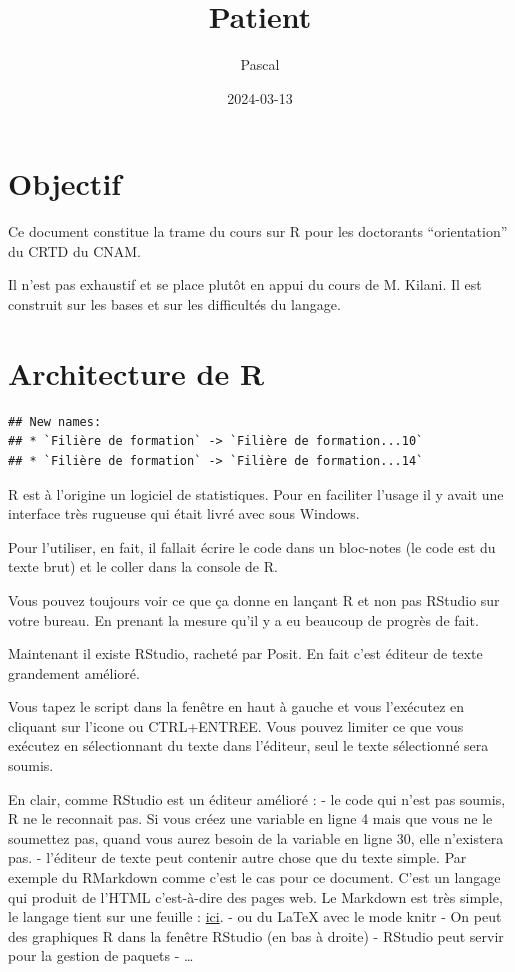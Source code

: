 \documentclass[
]{book}
\title{Patient}
\author{Pascal}
\date{2024-03-13}
\begin{document}
\maketitle

{
\setcounter{tocdepth}{1}
\tableofcontents
}
\chapter{Objectif}\label{objectif}

Ce document constitue la trame du cours sur R pour les doctorants ``orientation''
du CRTD du CNAM.

Il n'est pas exhaustif et se place plutôt en appui du cours de M. Kilani. Il est
construit sur les bases et sur les difficultés du langage.

\chapter{Architecture de R}\label{architecture-de-r}

\begin{verbatim}
## New names:
## * `Filière de formation` -> `Filière de formation...10`
## * `Filière de formation` -> `Filière de formation...14`
\end{verbatim}

R est à l'origine un logiciel de statistiques. Pour en faciliter l'usage il y
avait une interface très rugueuse qui était livré avec sous Windows.

Pour l'utiliser, en fait, il fallait écrire le code dans un bloc-notes (le code
est du texte brut) et le coller dans la console de R.

Vous pouvez toujours voir ce que ça donne en lançant R et non pas RStudio
sur votre bureau. En prenant la mesure qu'il y a eu beaucoup de progrès de fait.

Maintenant il existe RStudio, racheté par Posit. En fait c'est éditeur de texte
grandement amélioré.

Vous tapez le script dans la fenêtre en haut à gauche et vous l'exécutez en
cliquant sur l'icone ou CTRL+ENTREE. Vous pouvez limiter ce que vous exécutez
en sélectionnant du texte dans l'éditeur, seul le texte sélectionné sera soumis.

En clair, comme RStudio est un éditeur amélioré :
- le code qui n'est pas soumis, R ne le reconnait pas. Si vous créez une variable
en ligne 4 mais que vous ne le soumettez pas, quand vous aurez besoin de la
variable en ligne 30, elle n'existera pas.
- l'éditeur de texte peut contenir autre chose que du texte simple. Par exemple
du RMarkdown comme c'est le cas pour ce document. C'est un langage qui produit
de l'HTML c'est-à-dire des pages web. Le Markdown est très simple, le langage
tient sur une feuille : \href{https://www.markdownguide.org/cheat-sheet/}{ici}.
- ou du LaTeX avec le mode knitr
- On peut des graphiques R dans la fenêtre RStudio (en bas à droite)
- RStudio peut servir pour la gestion de paquets
- \ldots{}
\end{document}
